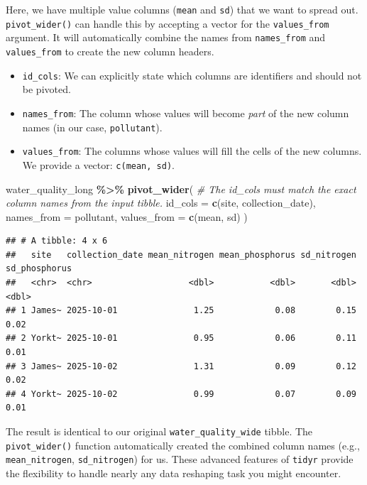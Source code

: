 \documentclass[
  11pt,
]{article}
\newenvironment{Shaded}{\begin{snugshade}}{\end{snugshade}}
\newcommand{\AttributeTok}[1]{\textcolor[rgb]{0.13,0.29,0.53}{#1}}
\newcommand{\CommentTok}[1]{\textcolor[rgb]{0.56,0.35,0.01}{\textit{#1}}}
\newcommand{\FunctionTok}[1]{\textcolor[rgb]{0.13,0.29,0.53}{\textbf{#1}}}
\newcommand{\NormalTok}[1]{#1}
\newcommand{\SpecialCharTok}[1]{\textcolor[rgb]{0.81,0.36,0.00}{\textbf{#1}}}
\providecommand{\tightlist}{%
  \setlength{\itemsep}{0pt}\setlength{\parskip}{0pt}}
\begin{document}
Here, we have multiple value columns (\texttt{mean} and \texttt{sd})
that we want to spread out. \texttt{pivot\_wider()} can handle this by
accepting a vector for the \texttt{values\_from} argument. It will
automatically combine the names from \texttt{names\_from} and
\texttt{values\_from} to create the new column headers.

\begin{itemize}
\tightlist
\item
  \texttt{id\_cols}: We can explicitly state which columns are
  identifiers and should not be pivoted.
\item
  \texttt{names\_from}: The column whose values will become \emph{part}
  of the new column names (in our case, \texttt{pollutant}).
\item
  \texttt{values\_from}: The columns whose values will fill the cells of
  the new columns. We provide a vector: \texttt{c(mean,\ sd)}.
\end{itemize}

\begin{Shaded}
\begin{Highlighting}[]
\NormalTok{water\_quality\_long }\SpecialCharTok{\%\textgreater{}\%}
  \FunctionTok{pivot\_wider}\NormalTok{(}
    \CommentTok{\# The id\_cols must match the exact column names from the input tibble.}
    \AttributeTok{id\_cols =} \FunctionTok{c}\NormalTok{(site, collection\_date), }
    \AttributeTok{names\_from =}\NormalTok{ pollutant,}
    \AttributeTok{values\_from =} \FunctionTok{c}\NormalTok{(mean, sd)}
\NormalTok{  )}
\end{Highlighting}
\end{Shaded}

\begin{verbatim}
## # A tibble: 4 x 6
##   site   collection_date mean_nitrogen mean_phosphorus sd_nitrogen sd_phosphorus
##   <chr>  <chr>                   <dbl>           <dbl>       <dbl>         <dbl>
## 1 James~ 2025-10-01               1.25            0.08        0.15          0.02
## 2 Yorkt~ 2025-10-01               0.95            0.06        0.11          0.01
## 3 James~ 2025-10-02               1.31            0.09        0.12          0.02
## 4 Yorkt~ 2025-10-02               0.99            0.07        0.09          0.01
\end{verbatim}

The result is identical to our original \texttt{water\_quality\_wide}
tibble. The \texttt{pivot\_wider()} function automatically created the
combined column names (e.g., \texttt{mean\_nitrogen},
\texttt{sd\_nitrogen}) for us. These advanced features of \texttt{tidyr}
provide the flexibility to handle nearly any data reshaping task you
might encounter.
\end{document}
